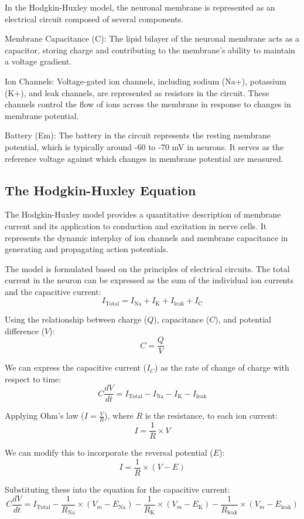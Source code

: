 \documentclass[12pt,a4paper]{report}
\begin{document}
In the Hodgkin-Huxley model, the neuronal membrane is represented as an electrical circuit composed of several components.

Membrane Capacitance (C): The lipid bilayer of the neuronal membrane acts as a capacitor, storing charge and contributing to the membrane's ability to maintain a voltage gradient.

Ion Channels: Voltage-gated ion channels, including sodium (Na+), potassium (K+), and leak channels, are represented as resistors in the circuit. These channels control the flow of ions across the membrane in response to changes in membrane potential.

Battery (Em): The battery in the circuit represents the resting membrane potential, which is typically around -60 to -70 mV in neurons. It serves as the reference voltage against which changes in membrane potential are measured.

\subsection{The Hodgkin-Huxley Equation}

The Hodgkin-Huxley model provides a quantitative description of membrane current and its application to conduction and excitation in nerve cells. It represents the dynamic interplay of ion channels and membrane capacitance in generating and propagating action potentials.

The model is formulated based on the principles of electrical circuits. The total current in the neuron can be expressed as the sum of the individual ion currents and the capacitive current:
\[
I_{\text{Total}} = I_{\text{Na}} + I_{\text{K}} + I_{\text{leak}} + I_{\text{C}}
\]

Using the relationship between charge ($Q$), capacitance ($C$), and potential difference ($V$):
\[
C = \frac{Q}{V}
\]

We can express the capacitive current ($I_C$) as the rate of change of charge with respect to time:
\[
C \frac{dV}{dt} = I_{\text{Total}} - I_{\text{Na}} - I_{\text{K}} - I_{\text{leak}}
\]

Applying Ohm's law ($I = \frac{V}{R}$), where $R$ is the resistance, to each ion current:
\[
I = \frac{1}{R} \times V
\]

We can modify this to incorporate the reversal potential ($E$):
\[
I = \frac{1}{R} \times (V - E)
\]

Substituting these into the equation for the capacitive current:
\[
C \frac{dV}{dt} = I_{\text{Total}} - \frac{1}{R_{\text{Na}}} \times (V_m - E_{\text{Na}}) - \frac{1}{R_{\text{K}}} \times (V_m - E_{\text{K}}) - \frac{1}{R_{\text{leak}}} \times (V_m - E_{\text{leak}})
\]
\end{document}
